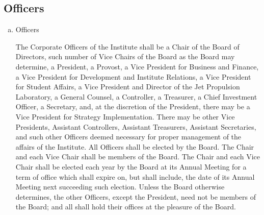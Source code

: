 \subsection{Officers}

\begin{enumerate}[(a)]
\item Officers

The Corporate Officers of the Institute shall be a Chair of the Board of Directors, such number of Vice Chairs of the Board as the Board may determine, a President, a Provost, a Vice President for Business and Finance, a Vice President for Development and Institute Relations, a Vice President for Student Affairs, a Vice President and Director of the Jet Propulsion Laboratory, a General Counsel, a Controller, a Treasurer, a Chief Investment Officer, a Secretary, and, at the discretion of the President, there may be a Vice President for Strategy Implementation.  There may be other Vice Presidents, Assistant Controllers, Assistant Treasurers, Assistant Secretaries, and such other Officers deemed necessary for proper management of the affairs of the Institute.  All Officers shall be elected by the Board.  The Chair and each Vice Chair shall be members of the Board.  The Chair and each Vice Chair shall be elected each year by the Board at its Annual Meeting for a term of office which shall expire on, but shall include, the date of its Annual Meeting next succeeding such election.  Unless the Board otherwise determines, the other Officers, except the President, need not be members of the Board; and all shall hold their offices at the pleasure of the Board.
\end{enumerate}

